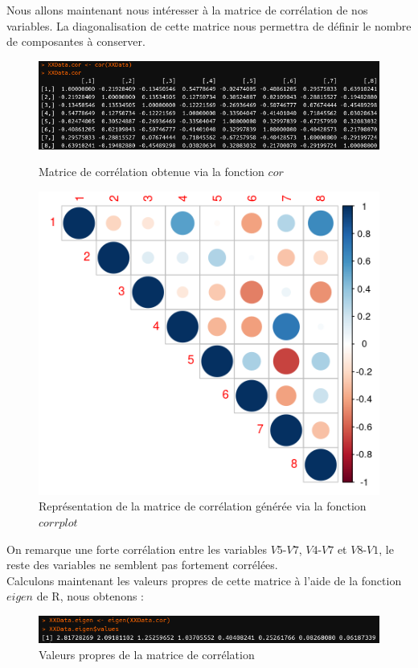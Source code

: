 \documentclass[11pt]{article}
\begin{document}
Nous allons maintenant nous intéresser à la matrice de corrélation de nos variables. La diagonalisation de cette matrice nous permettra de définir le nombre de composantes à conserver.\begin{figure}[H]
\centering
\includegraphics[scale=0.7]{cor.png}
\caption{Matrice de corrélation obtenue via la fonction $cor$}
\includegraphics[scale=1]{corrplot.png}
\caption{Représentation de la matrice de corrélation générée via la fonction $corrplot$}
\end{figure}
\noindent On remarque une forte corrélation entre les variables $V5$-$V7$, $V4$-$V7$ et $V8$-$V1$, le reste des variables ne semblent pas fortement corrélées.\\
\newpage
\noindent Calculons maintenant les valeurs propres de cette matrice à l'aide de la fonction $eigen$ de R, nous obtenons :
\begin{figure}[H]
\centering
\includegraphics[scale=0.7]{eigen.png}
\caption{Valeurs propres de la matrice de corrélation}
\end{figure}
\end{document}
